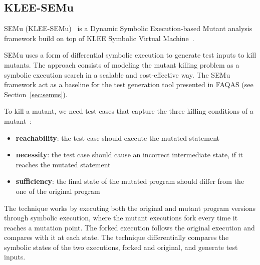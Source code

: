 
\subsection{KLEE-SEMu}
\label{klee-semu}

SEMu (KLEE-SEMu)~\cite{chekam2021killing} is a Dynamic Symbolic Execution-based Mutant analysis framework build on top of KLEE Symbolic Virtual Machine~\cite{cadar2008klee}.

SEMu uses a form of differential symbolic execution to generate test inputs to kill mutants. The approach consists of modeling the mutant killing problem as a symbolic execution search in a scalable and cost-effective way. 
The SEMu framework act as a baseline for the test generation tool presented in FAQAS (see Section~\ref{sec:semus}).

To kill a mutant, we need test cases that capture the three killing conditions of a mutant~\cite{offutt1997automatically}: 
\begin{itemize}
	\item \textbf{reachability}: the test case should execute the mutated statement
	\item \textbf{necessity}: the test case should cause an incorrect intermediate state, if it reaches the mutated statement
	\item \textbf{sufficiency}: the final state of the mutated program should differ from the one of the original program
\end{itemize}

The technique works by executing both the original and mutant program versions through symbolic execution, where the mutant executions fork every time it reaches a mutation point. The forked execution follows the original execution and compares with it at each state. 
The technique differentially compares the symbolic states of the two executions, forked and original, and generate test inputs. 

